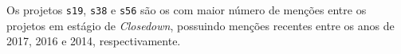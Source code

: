 
Os projetos \texttt{s19}, \texttt{s38} e \texttt{s56} são os com maior número de
menções entre os projetos em estágio de {\it Closedown}, possuindo menções
recentes entre os anos de 2017, 2016 e 2014, respectivamente.

%
%
%

%



%


